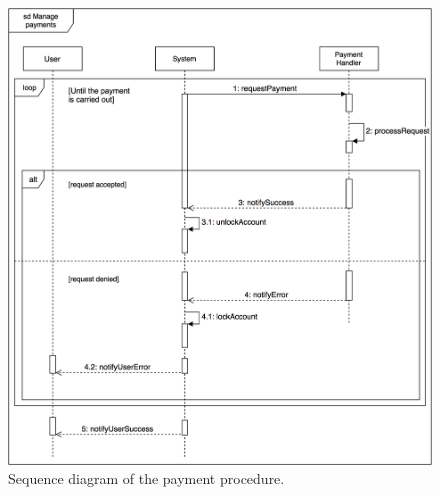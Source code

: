 \begin{figure}[H]
\begin{center}
		\includegraphics[width=\textwidth]{./specific_requirements/features/diagrams/manage_payments_sd.png}
		\caption{Sequence diagram of the payment procedure.}
		\label{man_pay_sd}
\end{center}
\end{figure}